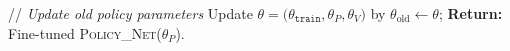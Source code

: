 \begin{algorithm}[H]
\begin{algorithmic}[1]
  \STATE // \textit{Update old policy parameters}
  \STATE Update $\theta = \big( \theta_{\texttt{train}}, \theta_P, \theta_V\big)$ by $\theta_{\mathrm{old}} \leftarrow \theta$;
\ENDFOR
\STATE \textbf{Return:} Fine-tuned \textsc{Policy\_Net}($\theta_P$).
\end{algorithmic}
\end{algorithm}






